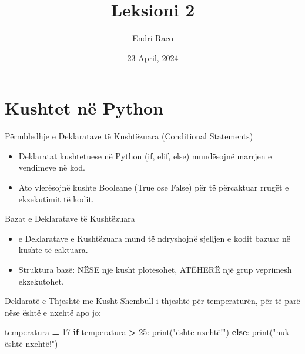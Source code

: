 \documentclass[
  ignorenonframetext,
]{beamer}
\title{Leksioni 2}
\author{Endri Raco}
\date{23 April, 2024}
\newenvironment{Shaded}{\begin{snugshade}}{\end{snugshade}}
\newcommand{\BuiltInTok}[1]{#1}
\newcommand{\ControlFlowTok}[1]{\textcolor[rgb]{0.13,0.29,0.53}{\textbf{#1}}}
\newcommand{\DecValTok}[1]{\textcolor[rgb]{0.00,0.00,0.81}{#1}}
\newcommand{\NormalTok}[1]{#1}
\newcommand{\OperatorTok}[1]{\textcolor[rgb]{0.81,0.36,0.00}{\textbf{#1}}}
\newcommand{\StringTok}[1]{\textcolor[rgb]{0.31,0.60,0.02}{#1}}
\begin{document}
\frame{\titlepage}

\begin{frame}[allowframebreaks]
  \tableofcontents[hideallsubsections]
\end{frame}
\hypertarget{kushtet-nuxeb-python}{%
\section{Kushtet në Python}\label{kushtet-nuxeb-python}}

\begin{frame}{Përmbledhje e Deklaratave të Kushtëzuara (Conditional
Statements)}
\protect\hypertarget{puxebrmbledhje-e-deklaratave-tuxeb-kushtuxebzuara-conditional-statements}{}
\begin{itemize}
\item
  Deklaratat kushtetuese në Python (if, elif, else) mundësojnë marrjen e
  vendimeve në kod.
\item
  Ato vlerësojnë kushte Booleane (True ose False) për të përcaktuar
  rrugët e ekzekutimit të kodit.
\end{itemize}
\end{frame}

\begin{frame}{Bazat e Deklaratave të Kushtëzuara}
\protect\hypertarget{bazat-e-deklaratave-tuxeb-kushtuxebzuara}{}
\begin{itemize}
\item
  e Deklaratave e Kushtëzuara mund të ndryshojnë sjelljen e kodit bazuar
  në kushte të caktuara.
\item
  Struktura bazë: NËSE një kusht plotësohet, ATËHERË një grup veprimesh
  ekzekutohet.
\end{itemize}
\end{frame}

\begin{frame}[fragile]{Deklaratë e Thjeshtë me Kusht}
\protect\hypertarget{deklaratuxeb-e-thjeshtuxeb-me-kusht}{}
Shembull i thjeshtë për temperaturën, për të parë nëse është e nxehtë
apo jo:

\begin{Shaded}
\begin{Highlighting}[]
\NormalTok{temperatura }\OperatorTok{=} \DecValTok{17}
\ControlFlowTok{if}\NormalTok{ temperatura }\OperatorTok{\textgreater{}} \DecValTok{25}\NormalTok{:}
    \BuiltInTok{print}\NormalTok{(}\StringTok{"është nxehtë!"}\NormalTok{)}
\ControlFlowTok{else}\NormalTok{:}
    \BuiltInTok{print}\NormalTok{(}\StringTok{"nuk është nxehtë!"}\NormalTok{)}
\end{Highlighting}
\end{Shaded}
\end{frame}
\end{document}

